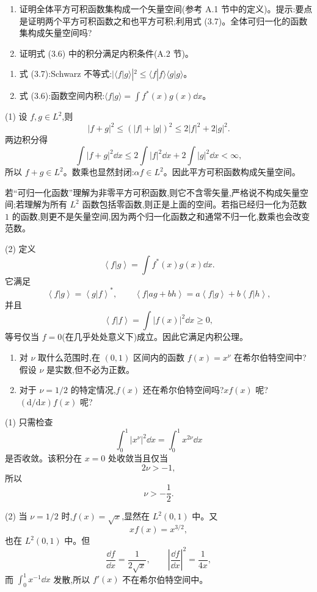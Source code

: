 \begin{question}
\begin{enumerate}
\item 证明全体平方可积函数集构成一个矢量空间(参考 A.1 节中的定义)。提示:要点是证明两个平方可积函数之和也平方可积;利用式 (3.7)。全体可归一化的函数集构成矢量空间吗?
\item 证明式 (3.6) 中的积分满足内积条件(A.2 节)。
\end{enumerate}

\par\smallskip
{}
\begin{enumerate}[leftmargin=2.2em,itemsep=0.12em,topsep=0.12em,parsep=0pt]
\item 式 (3.7):Schwarz 不等式:$|\langle f|g\rangle|^2\le \langle f|f\rangle\langle g|g\rangle$。
\item 式 (3.6):函数空间内积:$\langle f|g\rangle=\int f^*(x)g(x)\dd x$。
\end{enumerate}

\end{question}
\begin{solution}
(1) 设 $f,g\in L^2$,则
\[
|f+g|^2\le (|f|+|g|)^2\le 2|f|^2+2|g|^2 .
\]
两边积分得
\[
\int |f+g|^2\dd x\le 2\int |f|^2\dd x+2\int |g|^2\dd x<\infty,
\]
所以 $f+g\in L^2$。数乘也显然封闭:$\alpha f\in L^2$。因此平方可积函数构成矢量空间。

若“可归一化函数”理解为非零平方可积函数,则它不含零矢量,严格说不构成矢量空间;若理解为所有 $L^2$ 函数包括零函数,则正是上面的空间。若指已经归一化为范数 $1$ 的函数,则更不是矢量空间,因为两个归一化函数之和通常不归一化,数乘也会改变范数。

(2) 定义
\[
\left\langle f|g \right\rangle=\int f^*(x)g(x)\dd x .
\]
它满足
\[
\left\langle f|g \right\rangle=\left\langle g|f \right\rangle^*,\qquad
\left\langle f|ag+bh \right\rangle=a\left\langle f|g \right\rangle+b\left\langle f|h \right\rangle,
\]
并且
\[
\left\langle f|f \right\rangle=\int |f(x)|^2\dd x\ge 0,
\]
等号仅当 $f=0$(在几乎处处意义下)成立。因此它满足内积公理。
\end{solution}

\begin{question}
\begin{enumerate}
\item 对 $\nu$ 取什么范围时,在 $(0,1)$ 区间内的函数 $f(x)=x^\nu$ 在希尔伯特空间中?假设 $\nu$ 是实数,但不必为正数。
\item 对于 $\nu=1/2$ 的特定情况,$f(x)$ 还在希尔伯特空间吗?$x f(x)$ 呢?$(\mathrm d/\mathrm dx)f(x)$ 呢?
\end{enumerate}
\end{question}
\begin{solution}
(1) 只需检查
\[
\int_0^1 |x^\nu|^2\dd x=\int_0^1 x^{2\nu}\dd x
\]
是否收敛。该积分在 $x=0$ 处收敛当且仅当
\[
2\nu>-1,
\]
所以
\[
\boxed{\nu>-\frac12.}
\]

(2) 当 $\nu=1/2$ 时,$f(x)=\sqrt{x}$,显然在 $L^2(0,1)$ 中。又
\[
xf(x)=x^{3/2},
\]
也在 $L^2(0,1)$ 中。但
\[
\frac{\dd f}{\dd x}=\frac1{2\sqrt{x}},
\qquad
\left|\frac{\dd f}{\dd x}\right|^2=\frac1{4x},
\]
而 $\int_0^1 x^{-1}\dd x$ 发散,所以 $f'(x)$ 不在希尔伯特空间中。
\end{solution}

